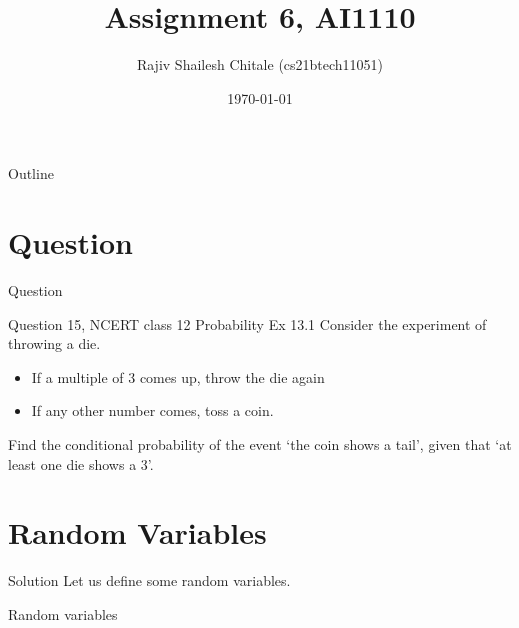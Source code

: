 \documentclass{beamer}
\begin{document}
\let\StandardTheFigure\thefigure
\let\vec\mathbf

\def\putbox#1#2#3{\makebox[0in][l]{\makebox[#1][l]{}\raisebox{\baselineskip}[0in][0in]{\raisebox{#2}[0in][0in]{#3}}}}
     \def\rightbox#1{\makebox[0in][r]{#1}}
     \def\centbox#1{\makebox[0in]{#1}}
     \def\topbox#1{\raisebox{-\baselineskip}[0in][0in]{#1}}
     \def\midbox#1{\raisebox{-0.5\baselineskip}[0in][0in]{#1}}
\vspace{3cm}


\title{Assignment 6, AI1110} 
\author{Rajiv Shailesh Chitale (cs21btech11051)}
\date{\today}
\logo{\large \LaTeX{}}
\begin{frame}
    \titlepage 
\end{frame}

\logo{}

\begin{frame}{Outline}
    \tableofcontents
\end{frame}
\section{Question}

\begin{frame}{Question}
     \begin{block}{ Question 15, NCERT class 12 Probability Ex 13.1}
    Consider the experiment of throwing a die.
    \begin{itemize}
        \item If a multiple of 3 comes up, throw the die again
        \item If any other number comes, toss a coin.
    \end{itemize}
     Find the conditional probability of the event \lq the coin shows a tail\rq, given that \lq at least one die shows a 3\rq.
     \end{block} 
\end{frame}

\section{Random Variables}
\begin{frame}{Solution}
    Let us define some random variables.
    \begin{table}[ht!]
        \centering
    	
        \caption{Random variables}
        \label{table:RandomVariables}	
    \end{table}
\end{frame}
\end{document}
